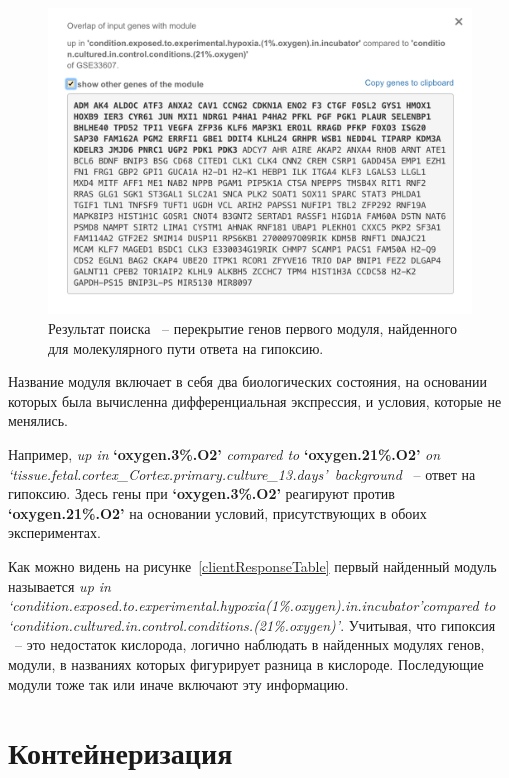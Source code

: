 \documentclass[times,specification,annotation]{itmo-student-thesis}
\begin{document}
\begin{figure}[!h]
    \caption{Результат поиска ~-- перекрытие генов первого модуля, найденного для молекулярного пути ответа на гипоксию.}\label{clientResponseOverlap}
    \centering
    \includegraphics[width=1\textwidth]{overlap}
\end{figure}

Название модуля включает в себя два биологических состояния, на основании которых была вычисленна дифференциальная экспрессия, и условия, которые не менялись.

Например, \textit{up in} \textbf{\lq oxygen.3\%.O2\rq } \textit{compared to} \textbf{\lq oxygen.21\%.O2\rq} \textit{on \lq tissue.fetal.cortex\_Cortex.primary.culture\_13.days\rq~background} ~-- ответ на гипоксию. Здесь гены при \textbf{\lq oxygen.3\%.O2\rq} реагируют против \textbf{\lq oxygen.21\%.O2\rq} на основании условий, присутствующих в обоих экспериментах. 

Как можно видень на рисунке~\ref{clientResponseTable} первый найденный модуль называется \textit{up in \lq condition.exposed.to.experimental.hypoxia(1\%.oxygen).in.incubator\rq compared to ​\lq condition.cultured.in.control.conditions.(21\%.oxygen)\rq}. Учитывая, что гипоксия ~-- это недостаток кислорода, логично наблюдать в найденных модулях генов, модули, в названиях которых фигурирует разница в кислороде. Последующие модули тоже так или иначе включают эту информацию. 

\section{Контейнеризация}
\end{document}
